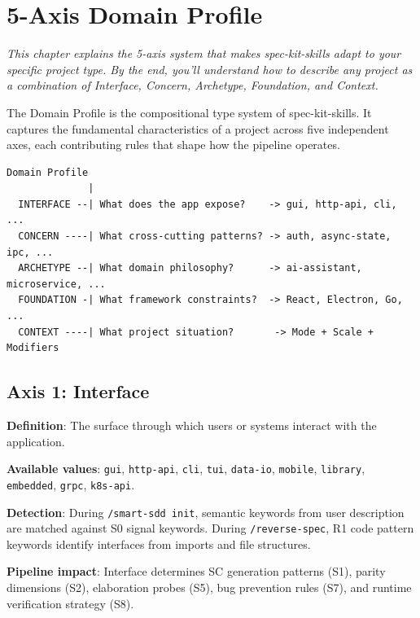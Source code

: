 \documentclass[11pt,a4paper,openright,twoside]{report}
\newcommand{\cmd}[1]{\texttt{/#1}}
\begin{document}
\chapter{5-Axis Domain Profile}
\label{ch:domain-profile}

\textit{This chapter explains the 5-axis system that makes spec-kit-skills adapt to your specific project type. By the end, you'll understand how to describe any project as a combination of Interface, Concern, Archetype, Foundation, and Context.}

The Domain Profile is the compositional type system of spec-kit-skills. It captures the fundamental characteristics of a project across five independent axes, each contributing rules that shape how the pipeline operates.

\begin{lstlisting}[title={Domain Profile Structure}]
              Domain Profile
              |
  INTERFACE --| What does the app expose?    -> gui, http-api, cli, ...
  CONCERN ----| What cross-cutting patterns? -> auth, async-state, ipc, ...
  ARCHETYPE --| What domain philosophy?      -> ai-assistant, microservice, ...
  FOUNDATION -| What framework constraints?  -> React, Electron, Go, ...
  CONTEXT ----| What project situation?       -> Mode + Scale + Modifiers
\end{lstlisting}

\section{Axis 1: Interface}

\textbf{Definition}: The surface through which users or systems interact with the application.

\textbf{Available values}: \texttt{gui}, \texttt{http-api}, \texttt{cli}, \texttt{tui}, \texttt{data-io}, \texttt{mobile}, \texttt{library}, \texttt{embedded}, \texttt{grpc}, \texttt{k8s-api}.

\textbf{Detection}: During \cmd{smart-sdd init}, semantic keywords from user description are matched against S0 signal keywords. During \cmd{reverse-spec}, R1 code pattern keywords identify interfaces from imports and file structures.

\textbf{Pipeline impact}: Interface determines SC generation patterns (S1), parity dimensions (S2), elaboration probes (S5), bug prevention rules (S7), and runtime verification strategy (S8).
\end{document}
